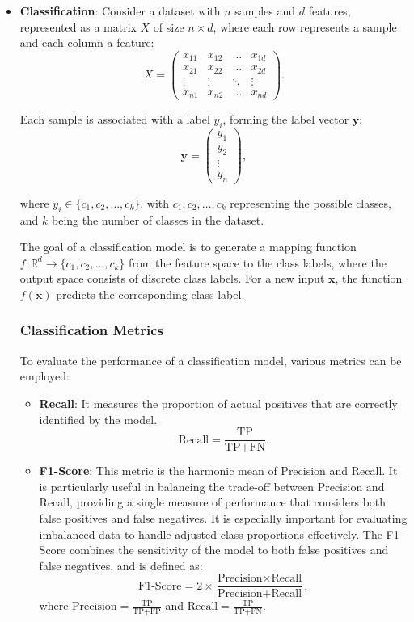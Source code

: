 \documentclass[12pt]{book}
\begin{document}
\begin{itemize}
    \item \textbf{Classification}: Consider a dataset with $n$ samples and $d$ features, represented as a matrix $X$ of size $n \times d$, where each row represents a sample and each column a feature:
    \[
    X = \begin{pmatrix} 
    x_{11} & x_{12} & \ldots & x_{1d} \\ 
    x_{21} & x_{22} & \ldots & x_{2d} \\ 
    \vdots & \vdots & \ddots & \vdots \\ 
    x_{n1} & x_{n2} & \ldots & x_{nd} 
    \end{pmatrix}.
    \]
    
    Each sample is associated with a label $y_i$, forming the label vector $\mathbf{y}$:
    \[
    \mathbf{y} = \begin{pmatrix} 
    y_1 \\ 
    y_2 \\ 
    \vdots \\ 
    y_n 
    \end{pmatrix},
    \]
    
    where $y_i \in \{c_1, c_2, \ldots, c_k\}$, with $c_1, c_2, \ldots, c_k$ representing the possible classes, and $k$ being the number of classes in the dataset.
    
    The goal of a classification model is to generate a mapping function $f: \mathbb{R}^d \rightarrow \{c_1, c_2, \ldots, c_k\} $ from the feature space to the class labels, where the output space consists of discrete class labels. For a new input $\mathbf{x}$, the function $f(\mathbf{x})$ predicts the corresponding class label.

    \subsubsection{Classification Metrics}
    To evaluate the performance of a classification model, various metrics can be employed:

    \begin{itemize}
        \item \textbf{Recall}: It measures the proportion of actual positives that are correctly identified by the model.
        \[
        \text{Recall} = \frac{\text{TP}}{\text{TP} + \text{FN}}.
        \]
        
        \item \textbf{F1-Score}: This metric is the harmonic mean of Precision and Recall. It is particularly useful in balancing the trade-off between Precision and Recall, providing a single measure of performance that considers both false positives and false negatives. It is especially important for evaluating imbalanced data to handle adjusted class proportions effectively. The F1-Score combines the sensitivity of the model to both false positives and false negatives, and is defined as:
        \[
        \text{F1-Score} = 2 \times \frac{\text{Precision} \times \text{Recall}}{\text{Precision} + \text{Recall}},
        \]
        where $\text{Precision} = \frac{\text{TP}}{\text{TP} + \text{FP}}$ and $\text{Recall} = \frac{\text{TP}}{\text{TP} + \text{FN}}$.
        

\end{itemize}
\end{itemize}
\end{document}
